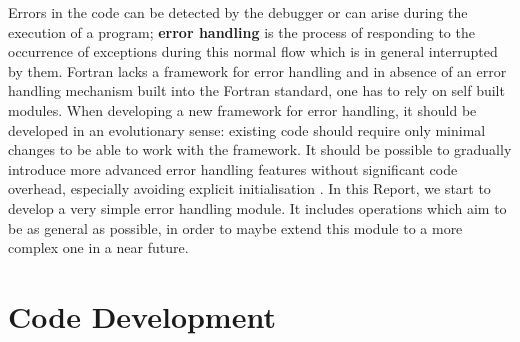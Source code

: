 \documentclass[rmp,10pt,onecolumn,fleqn,notitlepage]{revtex4-1}
\begin{document}
Errors in the code can be detected by the debugger or can arise during the execution of a program; \textbf{error handling} is the process of responding to the occurrence of exceptions during this normal flow which is in general interrupted by them. Fortran lacks a framework for error handling and in absence of an error handling mechanism built into the Fortran standard, one has to rely on self built modules.
When developing a new framework for error handling, it should be developed in an evolutionary sense: existing code should require only minimal changes to be able to work with the framework. It should be possible to gradually introduce more advanced error handling features without significant code overhead, especially avoiding explicit initialisation \cite{cite1}. In this Report, we start to develop a very simple error handling module. It includes operations which aim to be as general as possible, in order to maybe extend this module to a more complex one in a near future.



\section{Code Development}
\end{document}

